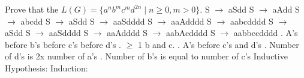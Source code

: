 \documentclass{article}
\begin{document}
\begin{enumerate}
  Prove that the $L(G) = \{a^nb^mc^md^{2n} \mid n \geq 0, m >
     0\}$. 
     \newline S $\rightarrow$ aSdd
     \newline S $\rightarrow$ aAdd
     \newline S $\rightarrow$ abcdd
     \newline\newline S $\rightarrow$ aSdd
     \newline S $\rightarrow$ aaSdddd
     \newline S $\rightarrow$ aaAdddd
     \newline S $\rightarrow$ aabcdddd
     \newline \newline S $\rightarrow$ aSdd
     \newline S $\rightarrow$ aaSdddd
     \newline S $\rightarrow$ aaAdddd
     \newline S $\rightarrow$ aabAcdddd
     \newline S $\rightarrow$ aabbccdddd
     \newline
     . A's before b's before c's before d's
     . $\geq$ 1 b and c.
     . A's before c's and d's
     . Number of d's is 2x number of a's
     . Number of b's is equal to number of c's
     \newline
     \newline Inductive Hypothesis:
     \newline Induction:
  

\end{enumerate}
\end{document}
